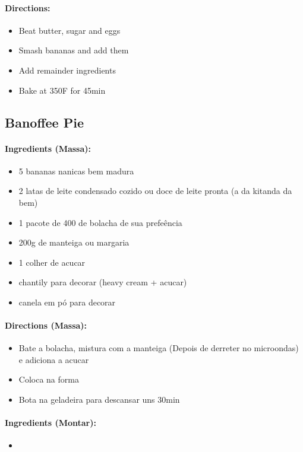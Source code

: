 \documentclass{article}
\begin{document}
\paragraph{Directions:}
\begin{itemize}
	\item Beat butter, sugar and eggs
	\item Smash bananas and add them
	\item Add remainder ingredients
	\item Bake at 350F for 45min
\end{itemize}


\subsection{Banoffee Pie}

\paragraph{Ingredients (Massa):}
\begin{itemize}
	\item 5 bananas nanicas bem madura
	\item 2 latas de leite condensado cozido ou doce de leite pronta (a da kitanda da bem)
	\item 1 pacote de 400 de bolacha de sua prefeência
	\item 200g de manteiga ou margaria
	\item 1 colher de acucar
	\item chantily para decorar (heavy cream + acucar)
	\item canela em pó para decorar
\end{itemize}

\paragraph{Directions (Massa):}
\begin{itemize}
	\item Bate a bolacha, mistura com a manteiga (Depois de derreter no microondas) e adiciona a acucar
	\item Coloca na forma
	\item Bota na geladeira para descansar uns 30min
\end{itemize}

\paragraph{Ingredients (Montar):}
\begin{itemize}
	\item
\end{itemize}
\end{document}
